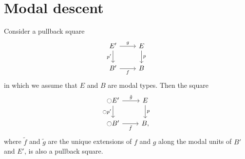 \documentclass[9pt,twosided]{amsart}
\begin{document}
\section{Modal descent}\label{section:modal-descent}

\begin{prp}\label{thm:etale_flattening}
Consider a pullback square
\begin{equation*}
\begin{tikzcd}
E' \arrow[d,swap,"{p'}"] \arrow[r,"g"] & E \arrow[d,"p"] \\
B' \arrow[r,swap,"f"] & B
\end{tikzcd}
\end{equation*}
in which we assume that $E$ and $B$ are modal types. Then the square
  \begin{equation*}
    \begin{tikzcd}
      \modal E' \arrow[r,"\tilde{g}"] \arrow[d,swap,"{\modal p'}"] & E \arrow[d,"p"] \\
      \modal B' \arrow[r,swap,"\tilde{f}"] & B,
    \end{tikzcd}
  \end{equation*}
  where $\tilde{f}$ and $\tilde{g}$ are the unique extensions of $f$ and $g$ along the modal units of $B'$ and $E'$, is also a pullback square.
\end{prp}
\end{document}
